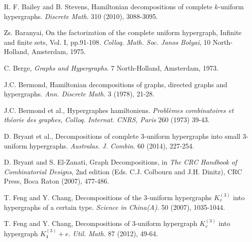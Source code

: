 \begin{thebibliography}{99}

  R. F. Bailey and B. Stevens,
  Hamiltonian decompositions of complete $k$-uniform hypergraphs.
  {\em Discrete Math}. 310 (2010), 3088-3095.

  Zs. Baranyai,
  On the factorization of the complete uniform hypergraph, Infinite and finite
  sets, Vol. I, pp.91-108.
  {\em Colloq. Math. Soc. Janos Bolyai}, 10 North-Holland, Amsterdam, 1975.

  C. Berge,
  {\em Graphs and Hypergraphs}.
  7 North-Holland, Amsterdam, 1973.

  J.C. Bermond,
  Hamiltonian decompositions of graphs, directed graphs and
  hypergraphs.
  {\em Ann. Discrete Math.} 3 (1978), 21-28.

  J.C. Bermond et al.,
  Hypergraphes hamiltoniens.
  {\em Probl\`{e}mes combinatoires et th\'{e}orie des graphes, Colloq.
  Internat. CNRS, Paris} 260 (1973) 39-43.

  D. Bryant et al.,
  Decompositions of complete 3-uniform hypergraphs into small 3-uniform hypergraphs.
  {\em Australas. J. Combin}. 60 (2014), 227-254.

  D. Bryant and S. El-Zanati,
  Graph Decompositions,
  in {\em The CRC Handbook of Combinatorial Designs}, 2nd edition
  (Eds. C.J. Colbourn and J.H. Dinitz),
  CRC Press, Boca Raton (2007), 477-486.

  

  T. Feng and Y. Chang,
  Decompositions of the 3-uniform hypergraphs $K_v^{(3)}$ into hypergraphs of a
  certain type.
  {\em Science in China(A)}. 50 (2007), 1035-1044.

  T. Feng and Y. Chang,
  Decompositions of 3-uniform hypergraph $K_v^{(3)}$ into hypergraph $K_4^{(3)}
  + e$.
  {\em Util. Math.} 87 (2012), 49-64.



\end{thebibliography}
